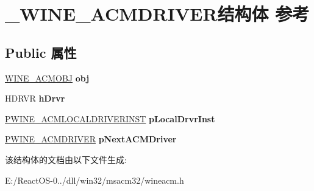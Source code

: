 \hypertarget{struct___w_i_n_e___a_c_m_d_r_i_v_e_r}{}\section{\+\_\+\+W\+I\+N\+E\+\_\+\+A\+C\+M\+D\+R\+I\+V\+E\+R结构体 参考}
\label{struct___w_i_n_e___a_c_m_d_r_i_v_e_r}
\subsection*{Public 属性}
\begin{DoxyCompactItemize}
\item 
\mbox{\label{struct___w_i_n_e___a_c_m_d_r_i_v_e_r_ac1b1c3c19473c3e55d421e406243584c}} 
\hyperlink{struct___w_i_n_e___a_c_m_o_b_j}{W\+I\+N\+E\+\_\+\+A\+C\+M\+O\+BJ} {\bfseries obj}
\item 
\mbox{\label{struct___w_i_n_e___a_c_m_d_r_i_v_e_r_a94aec9d0aece3c88df164a93805dfb07}} 
H\+D\+R\+VR {\bfseries h\+Drvr}
\item 
\mbox{\label{struct___w_i_n_e___a_c_m_d_r_i_v_e_r_a23c963552e51eadb4a760ef476b8e902}} 
\hyperlink{struct___w_i_n_e___a_c_m_l_o_c_a_l_d_r_i_v_e_r_i_n_s_t}{P\+W\+I\+N\+E\+\_\+\+A\+C\+M\+L\+O\+C\+A\+L\+D\+R\+I\+V\+E\+R\+I\+N\+ST} {\bfseries p\+Local\+Drvr\+Inst}
\item 
\mbox{\label{struct___w_i_n_e___a_c_m_d_r_i_v_e_r_af5fdf54245a7ece6b60996231b9f28d8}} 
\hyperlink{struct___w_i_n_e___a_c_m_d_r_i_v_e_r}{P\+W\+I\+N\+E\+\_\+\+A\+C\+M\+D\+R\+I\+V\+ER} {\bfseries p\+Next\+A\+C\+M\+Driver}
\end{DoxyCompactItemize}


该结构体的文档由以下文件生成\+:\begin{DoxyCompactItemize}
\item 
E\+:/\+React\+O\+S-\/0../dll/win32/msacm32/wineacm.\+h\end{DoxyCompactItemize}
